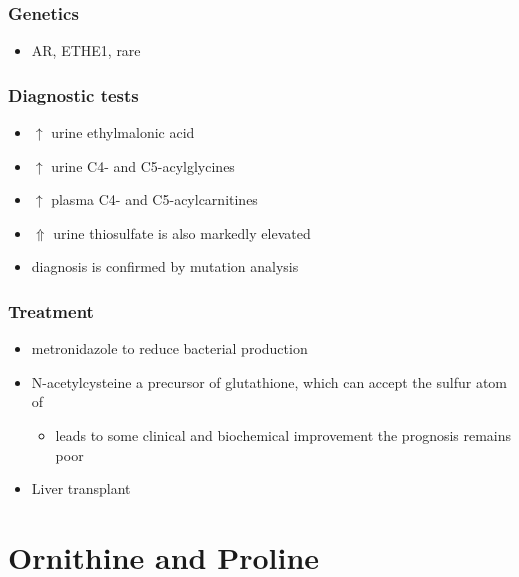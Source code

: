 \documentclass{scrartcl}
\begin{document}
\subsubsection{Genetics}
\label{sec:orgc4122d6}
\begin{itemize}
\item AR, ETHE1, rare
\end{itemize}

\subsubsection{Diagnostic tests}
\label{sec:orgbd8920a}
\begin{itemize}
\item \(\uparrow\) urine ethylmalonic acid
\item \(\uparrow\) urine C4- and C5-acylglycines
\item \(\uparrow\) plasma C4- and C5-acylcarnitines
\item \(\Uparrow\) urine thiosulfate is also markedly elevated
\item diagnosis is confirmed by mutation analysis
\end{itemize}

\subsubsection{Treatment}
\label{sec:orgc70de59}
\begin{itemize}
\item metronidazole to reduce bacterial  production
\item N-acetylcysteine a precursor of glutathione, which can accept the sulfur atom of 
\begin{itemize}
\item leads to some clinical and biochemical improvement the prognosis remains poor
\end{itemize}
\item Liver transplant
\end{itemize}

\section{Ornithine and Proline}
\label{sec:orgdc2b36c}
\end{document}
